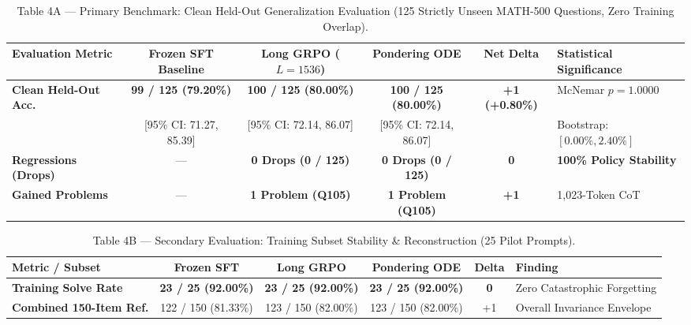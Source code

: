 \documentclass[11pt,a4paper]{article}
\begin{document}
\begin{table}[htbp]
\centering
\caption{Table 4A — Primary Benchmark: Clean Held-Out Generalization Evaluation (125 Strictly Unseen MATH-500 Questions, Zero Training Overlap).}
\label{tab:grpo_clean}
\small
\begin{tabular}{@{}lccccl@{}}
\toprule
\textbf{Evaluation Metric} & \textbf{Frozen SFT Baseline} & \textbf{Long GRPO ($L=1536$)} & \textbf{Pondering ODE} & \textbf{Net Delta} & \textbf{Statistical Significance} \\
\midrule
\textbf{Clean Held-Out Acc.} & \textbf{99 / 125 (79.20\%)} & \textbf{100 / 125 (80.00\%)} & \textbf{100 / 125 (80.00\%)} & \textbf{+1 (+0.80\%)} & McNemar $p = 1.0000$ \\
 & {\scriptsize [95\% CI: 71.27, 85.39]} & {\scriptsize [95\% CI: 72.14, 86.07]} & {\scriptsize [95\% CI: 72.14, 86.07]} & & Bootstrap: $[0.00\%, 2.40\%]$ \\
\addlinespace
\textbf{Regressions (Drops)} & --- & \textbf{0 Drops (0 / 125)} & \textbf{0 Drops (0 / 125)} & \textbf{0} & \textbf{100\% Policy Stability} \\
\textbf{Gained Problems} & --- & \textbf{1 Problem (Q105)} & \textbf{1 Problem (Q105)} & \textbf{+1} & 1,023-Token CoT \\
\bottomrule
\end{tabular}
\end{table}

\begin{table}[htbp]
\centering
\caption{Table 4B — Secondary Evaluation: Training Subset Stability \& Reconstruction (25 Pilot Prompts).}
\label{tab:grpo_train}
\small
\begin{tabular}{@{}lccccl@{}}
\toprule
\textbf{Metric / Subset} & \textbf{Frozen SFT} & \textbf{Long GRPO} & \textbf{Pondering ODE} & \textbf{Delta} & \textbf{Finding} \\
\midrule
\textbf{Training Solve Rate} & \textbf{23 / 25 (92.00\%)} & \textbf{23 / 25 (92.00\%)} & \textbf{23 / 25 (92.00\%)} & \textbf{0} & Zero Catastrophic Forgetting \\
\textbf{Combined 150-Item Ref.} & 122 / 150 (81.33\%) & 123 / 150 (82.00\%) & 123 / 150 (82.00\%) & +1 & Overall Invariance Envelope \\
\bottomrule
\end{tabular}
\end{table}
\end{document}
